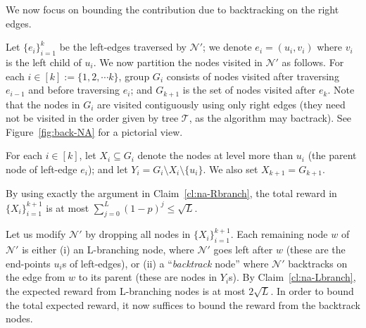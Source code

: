 \documentclass[11pt,letterpaper]{article}
\numberwithin{algorithm}{section}
\newcommand{\N}[0]{{\ensuremath{\mathcal{N}}}\xspace}
\newcommand{\sse}{\subseteq}
\newcommand{\T}{\ensuremath{\mathcal{T}}\xspace}
\begin{document}
We now focus on bounding the contribution due to backtracking on the right edges.

Let $\{e_i\}_{i=1}^k$ be the left-edges traversed by $\N'$; we denote $e_i=(u_i,v_i)$ where $v_i$ is the left child of $u_i$. We now partition the nodes visited in $\N'$ as follows. For each $i\in[k]:=\{1,2,\cdots k\}$, group $G_i$ consists of nodes visited after traversing $e_{i-1}$ and before traversing $e_i$; and $G_{k+1}$ is the set of nodes visited after $e_k$. Note that the nodes in $G_i$ are visited contiguously using only right edges (they need not be visited in the order given by tree \T, as the algorithm may bactrack). See Figure~\ref{fig:back-NA} for a pictorial view.

For each $i\in[k]$, let $X_i\sse G_i$ denote the nodes at level more than $u_i$ (the parent node of left-edge $e_i$); and  let $Y_i=G_i\setminus X_i\setminus \{u_i\}$. We also set $X_{k+1}=G_{k+1}$.

By using exactly the argument in Claim~\ref{cl:na-Rbranch}, the total reward in $\{X_i\}_{i=1}^{k+1}$ is at most
$\sum_{j=0}^L (1-p)^j \le \sqrt{L}$.

 Let us modify $\N'$ by dropping all nodes in $\{X_i\}_{i=1}^{k+1}$.
 Each remaining node $w$ of $\N'$ is either (i) an L-branching node, where $\N'$ goes left after $w$ (these are the end-points $u_i$s of left-edges), or (ii) a ``{\em backtrack} node'' where $\N'$ backtracks on the edge from $w$ to its parent (these are nodes in $Y_i$s). By Claim~\ref{cl:na-Lbranch}, the expected reward from L-branching nodes is at most $2\sqrt{L}$. In order to bound the total expected reward, it now suffices to bound the reward from the backtrack nodes.
\end{document}

